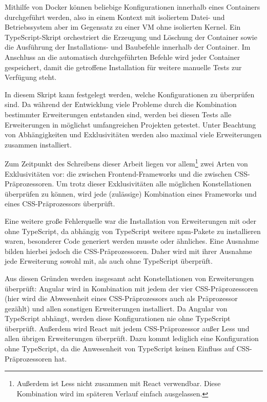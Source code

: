 Mithilfe von Docker können beliebige Konfigurationen innerhalb eines Containers durchgeführt werden, also in einem Kontext mit isoliertem Datei- und Betriebssystem aber im Gegensatz zu einer \gls{VM} ohne isolierten Kernel. Ein TypeScript-Skript orchestriert die Erzeugung und Löschung der Container sowie die Ausführung der Installations- und Baubefehle innerhalb der Container. Im Anschluss an die automatisch durchgeführten Befehle wird jeder Container gespeichert, damit die getroffene Installation für weitere manuelle Tests zur Verfügung steht.

In diesem Skript kann festgelegt werden, welche Konfigurationen zu überprüfen sind. Da während der Entwicklung viele Probleme durch die Kombination bestimmter Erweiterungen entstanden sind, werden bei diesen Tests alle Erweiterungen in möglichst umfangreichen Projekten getestet. Unter Beachtung von Abhängigkeiten und Exklusivitäten werden also maximal viele Erweiterungen zusammen installiert.

Zum Zeitpunkt des Schreibens dieser Arbeit liegen vor allem\footnote{Außerdem ist Less nicht zusammen mit React verwendbar. Diese Kombination wird im späteren Verlauf einfach ausgelassen.} zwei Arten von Exklusivitäten vor: die zwischen Frontend-Frameworks und die zwischen CSS-Präprozessoren. Um trotz dieser Exklusivitäten alle möglichen Konstellationen überprüfen zu können, wird jede (zulässige) Kombination eines Frameworks und eines CSS-Präprozessors überprüft.

Eine weitere große Fehlerquelle war die Installation von Erweiterungen mit oder ohne TypeScript, da abhängig von TypeScript weitere \gls{npm}-Pakete zu installieren waren, besonderer Code generiert werden musste oder ähnliches. Eine Ausnahme bilden hierbei jedoch die CSS-Präprozessoren. Daher wird mit ihrer Ausnahme jede Erweiterung sowohl mit, als auch ohne TypeScript überprüft.

Aus diesen Gründen werden insgesamt acht Konstellationen von Erweiterungen überprüft: Angular wird in Kombination mit jedem der vier CSS-Präprozessoren (hier wird die Abwesenheit eines CSS-Präprozessors auch als Präprozessor gezählt) und allen sonstigen Erweiterungen installiert. Da Angular von TypeScript abhängt, werden diese Konfigurationen nie ohne TypeScript überprüft. Außerdem wird React mit jedem CSS-Präprozessor außer Less und allen übrigen Erweiterungen überprüft. Dazu kommt lediglich eine Konfiguration ohne TypeScript, da die Anwesenheit von TypeScript keinen Einfluss auf CSS-Präprozessoren hat.

